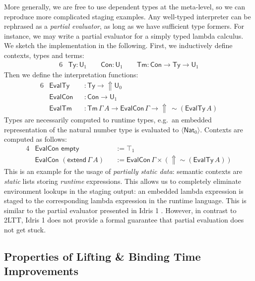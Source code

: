 \documentclass[acmsmall]{acmart}
\newcommand{\msf}[1]{\mathsf{#1}}
\newcommand{\Lift}{{\Uparrow}}
\newcommand{\spl}{{\sim}}
\newcommand{\qut}[1]{\langle #1\rangle}
\renewcommand{\U}{\msf{U}}
\newcommand{\Con}{\msf{Con}}
\newcommand{\Ty}{\msf{Ty}}
\newcommand{\Tm}{\msf{Tm}}
\newcommand{\Nat}{\msf{Nat}}
\theoremstyle{remark}
\begin{document}
More generally, we are free to use dependent types at the meta-level, so we can
reproduce more complicated staging examples. Any well-typed interpreter can be
rephrased as a \emph{partial evaluator}, as long as we have sufficient type
formers. For instance, we may write a partial evaluator for a simply typed
lambda calculus. We sketch the implementation in the following. First, we
inductively define contexts, types and terms:
\begin{alignat*}{6}
  & \Ty : \U_1  \hspace{2em} \Con : \U_1 \hspace{2em} \Tm : \Con \to \Ty \to \U_1
\end{alignat*}
Then we define the interpretation functions:
\begin{alignat*}{6}
  & \msf{EvalTy}  &&: \Ty \to \Lift \U_0 \\
  & \msf{EvalCon} &&: \Con \to \U_1 \\
  & \msf{EvalTm}  &&: \Tm\,\Gamma\,A \to \msf{EvalCon}\,\Gamma \to \Lift\,\spl(\msf{EvalTy}\,A)
\end{alignat*}
Types are necessarily computed to runtime types, e.g.\ an embedded
representation of the natural number type is evaluated to $\qut{\Nat_0}$.
Contexts are computed as follows:
\begin{alignat*}{4}
  &\msf{EvalCon}\,\,\msf{empty}                &&:= \top_1 \\
  &\msf{EvalCon}\,\,(\msf{extend}\,\Gamma\,A) &&:= \msf{EvalCon}\,\Gamma \times (\Lift \spl(\msf{EvalTy}\,A))
\end{alignat*}
This is an example for the usage of \emph{partially static
data}\cite{TODO}: semantic contexts are \emph{static} lists storing
\emph{runtime} expressions. This allows us to completely eliminate environment
lookups in the staging output: an embedded lambda expression is staged to the
corresponding lambda expression in the runtime language. This is similar to the
partial evaluator presented in Idris 1 \cite{TODO}. However, in contrast to
2LTT, Idris 1 does not provide a formal guarantee that partial evaluation does
not get stuck.

\subsection{Properties of Lifting \& Binding Time Improvements}
\end{document}
